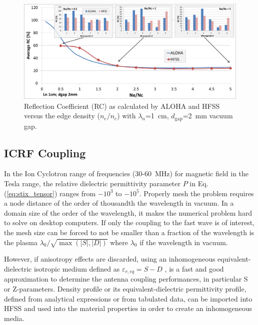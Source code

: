 \begin{figure}[h]
	\centering
	\includegraphics[width=0.98\linewidth]{figures/chap2/LHCD/LH_RC_vs_NeOverNc}
	\caption{Reflection Coefficient (RC) as calculated by ALOHA and HFSS versus the edge density   ($n_e/n_c$) with  $\lambda_n$=1~cm, $d_\mathrm{gap}$=2~mm vacuum gap.}
	\label{fig:LH_RC_vs_NeOverNc}
\end{figure}

\subsection{ICRF Coupling}
In the Ion Cyclotron range of frequencies (30-60~MHz) for magnetic field in the Tesla range, the relative dielectric permittivity parameter $P$ in Eq.(\ref{eq:stix_tensor}) ranges from $-10^3$ to $-10^5$. Properly mesh the problem requires a node distance of the order of thousandth the wavelength in vacuum. In a domain size of the order of the wavelength, it makes the numerical problem hard to solve on desktop computers. If only the coupling to the fast wave is of interest, the mesh size can be forced to not be smaller than a fraction of the wavelength is the plasma $\lambda_0/\sqrt{\max(|S|, |D|)}$ where $\lambda_0$ if the  wavelength in vacuum. 

However, if anisotropy effects are discarded, using an inhomogeneous equivalent-dielectric isotropic medium  defined as $\varepsilon_{r,eq}=S-D$ \cite{messiaen2011-1}, is a fast and good approximation to determine the antenna coupling performances, in particular S or Z-parameters. Density profile or its equivalent-dielectric permittivity profile, defined from analytical expressions or from tabulated data, can be imported into HFSS  and used into the material properties in order to create an inhomogeneous media. 


